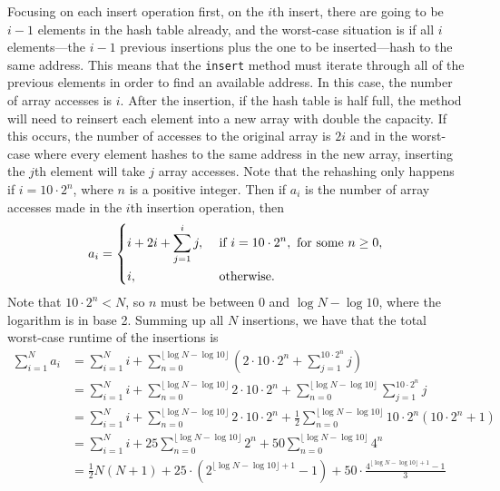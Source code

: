 \documentclass[11pt]{article}
\begin{document}
    Focusing on each insert operation first, on the \(i\)th insert, there are going to be \(i-1\) elements in the hash table already, and the worst-case situation is if all \(i\) elements---the \(i-1\) previous insertions plus the one to be inserted---hash to the same address. This means that the \texttt{insert} method must iterate through all of the previous elements in order to find an available address. In this case, the number of array accesses is \(i\). After the insertion, if the hash table is half full, the method will need to reinsert each element into a new array with double the capacity. If this occurs, the number of accesses to the original array is \(2i\) and in the worst-case where every element hashes to the same address in the new array, inserting the \(j\)th element will take \(j\) array accesses. Note that the rehashing only happens if \(i = 10 \cdot 2^n\), where \(n\) is a positive integer. Then if \(a_i\) is the number of array accesses made in the \(i\)th insertion operation, then
    \[
        a_i = \begin{dcases}
            i + 2i + \sum_{j=1}^{i} j, &\text{ if } i = 10 \cdot 2^n, \text{ for some }  n \geq 0,\\
            i, &\text{ otherwise} .
        \end{dcases}
    \]
    Note that \(10\cdot 2^n < N\), so \(n\) must be between 0 and \(\log N - \log 10\), where the logarithm is in base 2. Summing up all \(N\) insertions, we have that the total worst-case runtime of the insertions is
    \begin{align*}
        \sum_{i=1}^{N} a_i &= \sum_{i=1}^{N} i + \sum_{n=0}^{\lfloor \log N  - \log 10 \rfloor} \left( 2\cdot 10\cdot 2^n + \sum_{j=1}^{10 \cdot 2^n} j \right) \\
        &= \sum_{i=1}^{N} i + \sum_{n=0}^{\lfloor \log N - \log 10\rfloor} 2\cdot 10\cdot 2^n + \sum_{n=0}^{\lfloor \log N - \log 10\rfloor}\sum_{j=1}^{10 \cdot 2^n} j \\
        &= \sum_{i=1}^{N} i + \sum_{n=0}^{\lfloor \log N - \log 10\rfloor} 2\cdot 10\cdot 2^n + \frac{1}{2}\sum_{n=0}^{\lfloor \log N - \log 10\rfloor} 10\cdot 2^n(10 \cdot 2^n + 1) \\
        &=\sum_{i=1}^{N} i + 25 \sum_{n=0}^{\lfloor \log N - \log 10\rfloor} 2^n + 50\sum_{n=0}^{\lfloor \log N - \log 10\rfloor} 4^n \\
        &= \frac{1}{2}N(N+1)+25 \cdot (2^{\lfloor \log N - \log 10\rfloor + 1} - 1) + 50 \cdot \frac{4^{\lfloor \log N - \log 10\rfloor + 1} - 1}{3}
    \end{align*}
\end{document}
